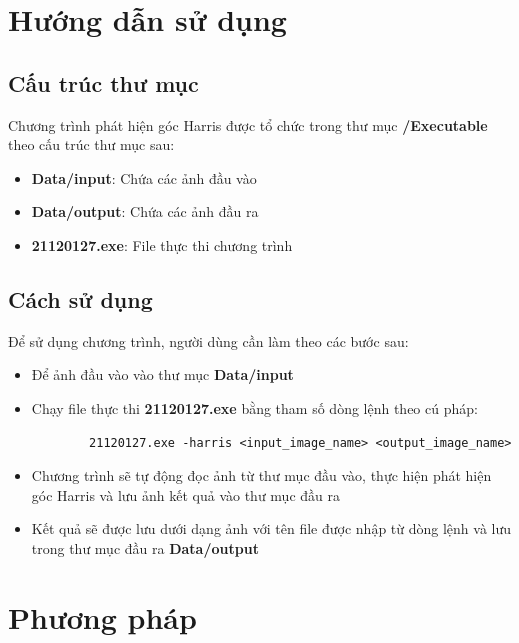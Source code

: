 \documentclass[12pt]{article}
\begin{document}



\setcounter{page}{1}

\section{Hướng dẫn sử dụng}
\subsection{Cấu trúc thư mục}

Chương trình phát hiện góc Harris được tổ chức trong thư mục \textbf{/Executable} theo cấu trúc thư mục sau:

\begin{itemize}
    \item \textbf{Data/input}: Chứa các ảnh đầu vào
    \item \textbf{Data/output}: Chứa các ảnh đầu ra
    \item \textbf{21120127.exe}: File thực thi chương trình
\end{itemize}

\subsection{Cách sử dụng}

Để sử dụng chương trình, người dùng cần làm theo các bước sau:

\begin{itemize}
    \item Để ảnh đầu vào vào thư mục \textbf{Data/input}
    \item Chạy file thực thi \textbf{21120127.exe} bằng tham số dòng lệnh theo cú pháp:
    \begin{verbatim}
        21120127.exe -harris <input_image_name> <output_image_name>
    \end{verbatim}
    \item Chương trình sẽ tự động đọc ảnh từ thư mục đầu vào, thực hiện phát hiện góc Harris và lưu ảnh kết quả vào thư mục đầu ra
    \item Kết quả sẽ được lưu dưới dạng ảnh với tên file được nhập từ dòng lệnh và lưu trong thư mục đầu ra \textbf{Data/output}
\end{itemize}

\section{Phương pháp}
\end{document}
